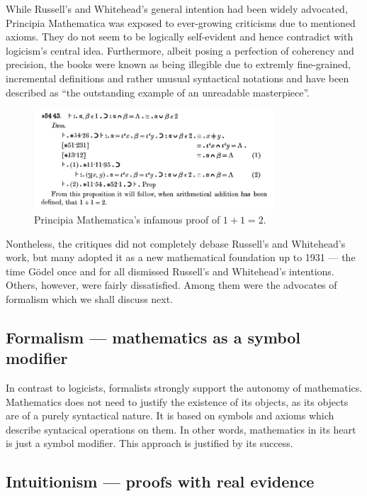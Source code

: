 \documentclass[hidelinks]{article}
\theoremstyle{plain}
\theoremstyle{definition}
\theoremstyle{rem}
\begin{document}
While Russell's and Whitehead's general intention had been widely advocated, Principia Mathematica was exposed to ever-growing criticisms due to mentioned axioms. They do not seem to be logically self-evident and hence contradict with logicism's central idea. Furthermore, albeit posing a perfection of coherency and precision, the books were known as being illegible due to extremly fine-grained, incremental definitions and rather unusual syntactical notations and have been described as ``the outstanding example of an unreadable masterpiece''\cite{math_experience}.

\begin{figure}[h]
	\centering
	\includegraphics[width=0.8\textwidth]{img/principia_mathematica.png}
	\caption{Principia Mathematica's infamous proof of $1+1=2$.}
\end{figure}

Nontheless, the critiques did not completely debase Russell's and Whitehead's work, but many adopted it as a new mathematical foundation up to 1931 --- the time Gödel once and for all dismissed Russell's and Whitehead's intentions. Others, however, were fairly dissatisfied. Among them were the advocates of formalism which we shall discuss next.

\subsection{Formalism --- mathematics as a symbol modifier}
In contrast to logicists, formalists strongly support the autonomy of mathematics. 
Mathematics does not need to justify the existence of its objects, as its objects are of a purely syntactical nature. It is based on symbols and axioms which describe syntacical operations on them. In other words, mathematics in its heart is just a symbol modifier.
This approach is justified by its success. 


\subsection{Intuitionism --- proofs with real evidence}
\end{document}
